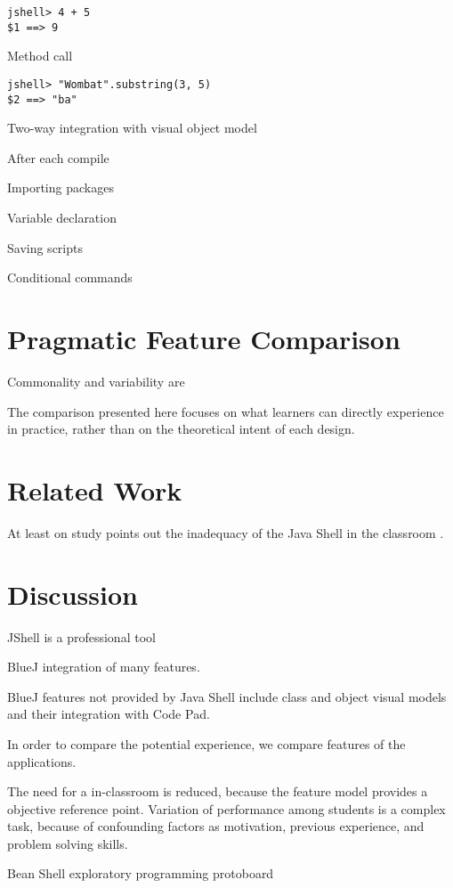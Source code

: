 \documentclass{article}
\begin{document}
\begin{lstlisting}
jshell> 4 + 5
$1 ==> 9
\end{lstlisting}

Method call
\begin{lstlisting}
jshell> "Wombat".substring(3, 5)
$2 ==> "ba"
\end{lstlisting}
Two-way integration with visual object model

After each compile

Importing packages

Variable declaration

Saving scripts

Conditional commands


\section{Pragmatic Feature Comparison}
Commonality and variability are

The comparison presented here focuses on what learners can directly experience in practice, rather than on the theoretical intent of each design.

\section{Related Work}

At least on study points out the inadequacy of the Java Shell in the classroom
\cite{politz_minnes2018jshell}.

\section{Discussion}

JShell is a professional tool

BlueJ integration of many features.

BlueJ features not provided by Java Shell include class and object visual models and their integration with Code Pad.

In order to compare the potential experience, we compare features of the applications.

The need for a in-classroom is reduced, because the feature model provides a objective reference point. Variation of performance among students is a complex task, because of confounding factors as motivation, previous experience, and problem solving skills.

Bean Shell exploratory programming
protoboard
\end{document}
